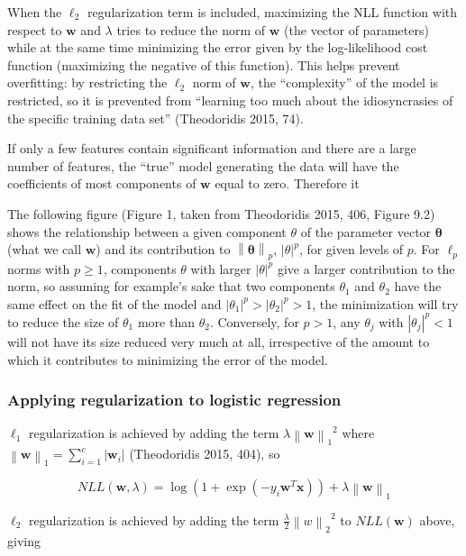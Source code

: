 \documentclass[letterpaper, 11pt]{article}
\newcommand{\norm}[1]{\left\lVert #1 \right\rVert}
\newcommand{\vect}[1]{\boldsymbol{#1}}
\begin{document}
When the $\ell_2$ regularization term is included, maximizing the NLL function with respect to $\vect{w}$ and $\lambda$ tries to reduce the norm of $\vect{w}$ (the vector of parameters) while at the same time minimizing the error given by the log-likelihood cost function (maximizing the negative of this function). This helps prevent overfitting: by restricting the $\ell_2$ norm of $\vect{w}$, the ``complexity'' of the model is restricted, so it is prevented from ``learning too much about the idiosyncrasies of the specific training data set'' (Theodoridis 2015, 74).

If only a few features contain significant information and there are a large number of features, the ``true'' model generating the data will have the coefficients of most components of $\vect{w}$ equal to zero. Therefore it 

The following figure (Figure 1, taken from Theodoridis 2015, 406, Figure 9.2) shows the relationship between a given component $\theta$ of the parameter vector $\vect{\theta}$ (what we call $\vect{w}$) and its contribution to $\norm{\vect{\theta}}_p$, $|\theta|^p$, for given levels of $p$. For $\ell_p$ norms with $p \geq 1$, components $\theta$ with larger $|\theta|^p$ give a larger contribution to the norm, so assuming for example's sake that two components $\theta_1$ and $\theta_2$ have the same effect on the fit of the model and $|\theta_1|^p > |\theta_2|^p > 1$, the minimization will try to reduce the size of $\theta_1$ more than $\theta_2$. Conversely, for $p > 1$, any $\theta_j$ with $|\theta_j|^p < 1$ will not have its size reduced very much at all, irrespective of the amount to which it contributes to minimizing the error of the model.

\subsubsection{Applying regularization to logistic regression}

$\ell_1$ regularization is achieved by adding the term $\lambda {\norm{\vect{w}}_1}^2$ where $\norm{\vect{w}}_1 = \sum_{i=1}^{c} |\vect{w}_i|$ (Theodoridis 2015, 404), so

\begin{equation*}
  NLL(\vect{w}, \lambda) = \log(1 + \exp(-y_i \vect{w}^T\vect{x})) + \lambda {\norm{\vect{w}}_1}
\end{equation*}


$\ell_2$ regularization is achieved by adding the term $\frac{\lambda}{2} {\norm{w}_2}^2$ to $NLL(\vect{w})$ above, giving
\end{document}
